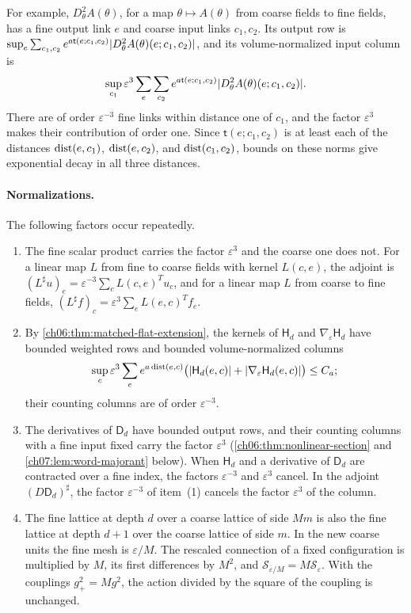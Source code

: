 For example, $D^2_\theta A(\theta)$, for a map $\theta\mapsto A(\theta)$ from coarse fields to fine fields, has a fine output link $e$ and coarse input links $c_1,c_2$. Its output row is $\sup_e\sum_{c_1,c_2}e^{a\mathsf t(e;c_1,c_2)}\lvert D^2_\theta A(\theta)(e;c_1,c_2)\rvert$, and its volume-normalized input column is
\[
 \sup_{c_1}\varepsilon^3\sum_e\sum_{c_2}e^{a\mathsf t(e;c_1,c_2)}\lvert D^2_\theta A(\theta)(e;c_1,c_2)\rvert.
\]
There are of order $\varepsilon^{-3}$ fine links within distance one of $c_1$, and the factor $\varepsilon^3$ makes their contribution of order one. Since $\mathsf t(e;c_1,c_2)$ is at least each of the distances $\operatorname{dist}(e,c_1)$, $\operatorname{dist}(e,c_2)$, and $\operatorname{dist}(c_1,c_2)$, bounds on these norms give exponential decay in all three distances.

\paragraph{Normalizations.}
The following factors occur repeatedly.
\begin{enumerate}
\item The fine scalar product carries the factor $\varepsilon^3$ and the coarse one does not. For a linear map $L$ from fine to coarse fields with kernel $L(c,e)$, the adjoint is $(L^\sharp u)_e=\varepsilon^{-3}\sum_cL(c,e)^Tu_c$, and for a linear map $L$ from coarse to fine fields, $(L^\sharp f)_c=\varepsilon^3\sum_eL(e,c)^Tf_e$.
\item By \cref{ch06:thm:matched-flat-extension}, the kernels of $\mathsf H_d$ and $\nabla_\varepsilon\mathsf H_d$ have bounded weighted rows and bounded volume-normalized columns
\[
 \sup_c\varepsilon^3\sum_ee^{a\operatorname{dist}(e,c)}\bigl(\lvert \mathsf H_d(e,c)\rvert+\lvert \nabla_\varepsilon\mathsf H_d(e,c)\rvert\bigr)\le C_a;
\]
their counting columns are of order $\varepsilon^{-3}$.
\item The derivatives of $\mathsf D_d$ have bounded output rows, and their counting columns with a fine input fixed carry the factor $\varepsilon^3$ (\cref{ch06:thm:nonlinear-section} and \cref{ch07:lem:word-majorant} below). When $\mathsf H_d$ and a derivative of $\mathsf D_d$ are contracted over a fine index, the factors $\varepsilon^{-3}$ and $\varepsilon^3$ cancel. In the adjoint $(D\mathsf D_d)^\sharp$, the factor $\varepsilon^{-3}$ of item~(1) cancels the factor $\varepsilon^3$ of the column.
\item The fine lattice at depth $d$ over a coarse lattice of side $Mm$ is also the fine lattice at depth $d+1$ over the coarse lattice of side $m$. In the new coarse units the fine mesh is $\varepsilon/M$. The rescaled connection of a fixed configuration is multiplied by $M$, its first differences by $M^2$, and $\mathscr S_{\varepsilon/M}=M\mathscr S_\varepsilon$. With the couplings $g_+^2=Mg^2$, the action divided by the square of the coupling is unchanged.
\end{enumerate}


